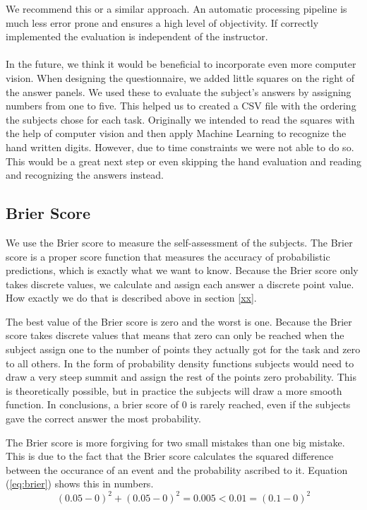 \documentclass[../main/main.tex]{subfiles}
\begin{document}
	We recommend this or a similar approach. An automatic processing pipeline is much less error prone and ensures a high level of objectivity. If correctly implemented the evaluation is independent of the instructor. 
	\\\\
	In the future, we think it would be beneficial to incorporate even more computer vision. When designing the questionnaire, we added little squares on the right of the answer panels. We used these to evaluate the subject's answers by assigning numbers from one to five. This helped us to created a CSV file with the ordering the subjects chose for each task. Originally we intended to read the squares with the help of computer vision and then apply Machine Learning to recognize the hand written digits. However, due to time constraints we were not able to do so. This would be a great next step or even skipping the hand evaluation and reading and recognizing the answers instead.
	
	\subsection{Brier Score}
	
	We use the Brier score to measure the self-assessment of the subjects. The Brier score is a proper score function that measures the accuracy of probabilistic predictions, which is exactly what we want to know. Because the Brier score only takes discrete values, we calculate and assign each answer a discrete point value. How exactly we do that is described above in section \ref{xx}. 
	
	The best value of the Brier score is zero and the worst is one. Because the Brier score takes discrete values that means that zero can only be reached when the subject assign one to the number of points they actually got for the task and zero to all others. In the form of probability density functions subjects would need to draw a very steep summit and assign the rest of the points zero probability. This is theoretically possible, but in practice the subjects will draw a more smooth function. In conclusions, a brier score of 0 is rarely reached, even if the subjects gave the correct answer the most probability.
	
	The Brier score is more forgiving for two small mistakes than one big mistake. This is due to the fact that the Brier score calculates the squared difference between the occurance of an event and the probability ascribed to it. Equation (\ref{eq:brier}) shows this in numbers.
	\begin{equation}
	\label{eq:brier}
	(0.05 - 0)^2 + (0.05 - 0)^2 = 0.005 < 0.01 = (0.1 - 0)^2
	\end{equation}
	
\end{document}
